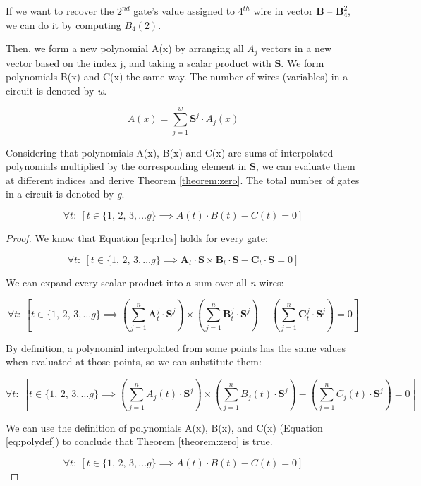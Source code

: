 \begin{exmp}
\label{ex:recover}
If we want to recover the $2^{nd}$ gate's value assigned to $4^{th}$ wire in vector \textbf{B} -- $\textbf{B}_4^2$, we can do it by computing $B_4(2)$.
\end{exmp}

\noindent Then, we form a new polynomial A(x) by arranging all $A_j$ vectors in a new vector based on the index j, and taking a scalar product with \textbf{S}. We form polynomials B(x) and C(x) the same way. The number of wires (variables) in a circuit is denoted by \textit{w}.

\begin{equation}
    \label{eq:polydef}
A(x) = \sum_{j = 1}^{w} \textbf{S}^j \cdot A_j(x)
\end{equation}

\noindent Considering that polynomials A(x), B(x) and C(x) are sums of interpolated polynomials multiplied by the corresponding element in \textbf{S}, we can evaluate them at different indices and derive Theorem \ref{theorem:zero}. The total number of gates in a circuit is denoted by \textit{g}.



\begin{theorem}
    \label{theorem:zero}
    $$\forall t:\: [t \in \{1,\,2,\,3, \dots g\} \implies A(t) \cdot B(t) - C(t) = 0]$$
\end{theorem}

\begin{proof}
    We know that Equation \ref{eq:r1cs} holds for every gate:

    $$\forall t:\: [t \in \{1,\,2,\,3, \dots g\} \implies \textbf{A}_t \cdot \textbf{S} \times \textbf{B}_t \cdot \textbf{S} - \textbf{C}_t \cdot \textbf{S} = 0]$$

    \noindent We can expand every scalar product into a sum over all \textit{n} wires:

    $$\forall t:\: [t \in \{1,\,2,\,3, \dots g\} \implies (\sum_{j = 1}^{n} \textbf{A}_t^j \cdot \textbf{S}^j) \times (\sum_{j = 1}^{n} \textbf{B}_t^j \cdot \textbf{S}^j) - (\sum_{j = 1}^{n} \textbf{C}_t^j \cdot \textbf{S}^j) = 0]$$

    \noindent By definition, a polynomial interpolated from some points has the same values when evaluated at those points, so we can substitute them:

    $$\forall t:\: [t \in \{1,\,2,\,3, \dots g\} \implies (\sum_{j = 1}^{n} A_j(t) \cdot \textbf{S}^j) \times (\sum_{j = 1}^{n} B_j(t) \cdot \textbf{S}^j) - (\sum_{j = 1}^{n} C_j(t) \cdot \textbf{S}^j) = 0]$$

    \noindent We can use the definition of polynomials A(x), B(x), and C(x) (Equation \ref{eq:polydef}) to conclude that Theorem \ref{theorem:zero} is true.

    $$\forall t:\: [t \in \{1,\,2,\,3, \dots g\} \implies A(t) \cdot B(t) - C(t) = 0]$$

\end{proof}

